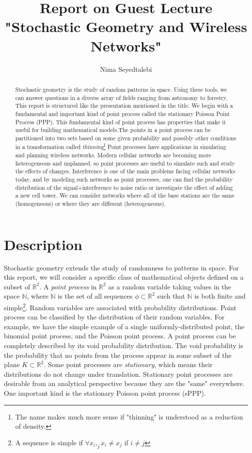 \documentclass[]{article}
\title{Report on Guest Lecture "Stochastic Geometry and Wireless Networks"}
\author{Nima Seyedtalebi}
\begin{document}
\maketitle

\begin{abstract}
Stochastic geometry is the study of random patterns in space. Using these tools, we can answer questions in a diverse array of fields ranging from astronomy to forestry. This report is structured like the presentation mentioned in the title. We begin with a fundamental and important kind of point process called the stationary Poisson Point Process (PPP). This fundamental kind of point process has properties that make it useful for building mathematical models.The points in a point process can be partitioned into two sets based on some given probability and possibly other conditions in a transformation called \textit{thinning}\footnote{The name makes much more sense if "thinning" is understood as a reduction of density.} Point processes have applications in simulating and planning wireless networks. Modern cellular networks are becoming more heterogeneous and unplanned, so point processes are useful to simulate such and study the effects of changes. Interference is one of the main problems facing cellular networks today, and by modeling such networks as point processes, one can find the probability distribution of the signal+interference to noise ratio or investigate the effect of adding a new cell tower. We can consider networks where all of the base stations are the same (homogeneous) or where they are different (heterogeneous).
\end{abstract}

\section{Description}
Stochastic geometry extends the study of randomness to patterns in space. For this report, we will consider a specific class of mathematical objects defined on a subset of $\mathbb{R}^2$. A \textit{point process} in $\mathbb{R}^2$ as a random variable taking values in the space $\mathbb{N}$, where $\mathbb{N}$ is the set of all sequences $\phi \subset \mathbb{R}^2$ such that $\mathbb{N}$ is both finite and simple\cite{kham}\footnote{A sequence is simple if $\forall x_i,_j x_i \neq x_j$ if $i \neq j$}. Random variables are associated with probability distributions. Point process can be classified by the distribution of their random variables. For example, we have the simple example of a single uniformly-distributed point, the binomial point process, and the Poisson point process. A point process can be completely described by its void probability distribution. The void probability is the probability that no points from the process appear in some subset of the plane $K \subset \mathbb{R}^2$\cite{ppp}.
Some point processes are \textit{stationary}, which means their distributions do not change under translation.
Stationary point processes are desirable from an analytical perspective because they are the "same" everywhere. One important kind is the stationary Poisson point process (sPPP).
\end{document}
